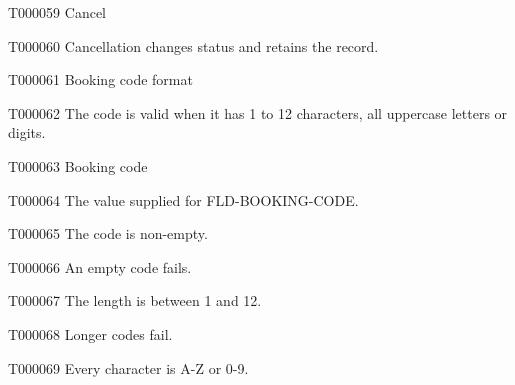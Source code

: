 \documentclass[11pt,a4paper]{article}
\begin{document}
\begin{atlastext}{T000059}
Cancel
\end{atlastext}
\begin{atlasparagraph}{T000060}
Cancellation changes status and retains the record.
\end{atlasparagraph}
\begin{atlastext}{T000061}
Booking code format
\end{atlastext}
\begin{atlasparagraph}{T000062}
The code is valid when it has 1 to 12 characters, all uppercase letters or digits.
\end{atlasparagraph}
\begin{atlastext}{T000063}
Booking code
\end{atlastext}
\begin{atlasparagraph}{T000064}
The value supplied for FLD-BOOKING-CODE.
\end{atlasparagraph}
\begin{atlastext}{T000065}
The code is non-empty.
\end{atlastext}
\begin{atlasparagraph}{T000066}
An empty code fails.
\end{atlasparagraph}
\begin{atlastext}{T000067}
The length is between 1 and 12.
\end{atlastext}
\begin{atlasparagraph}{T000068}
Longer codes fail.
\end{atlasparagraph}
\begin{atlastext}{T000069}
Every character is A-Z or 0-9.
\end{atlastext}
\end{document}
